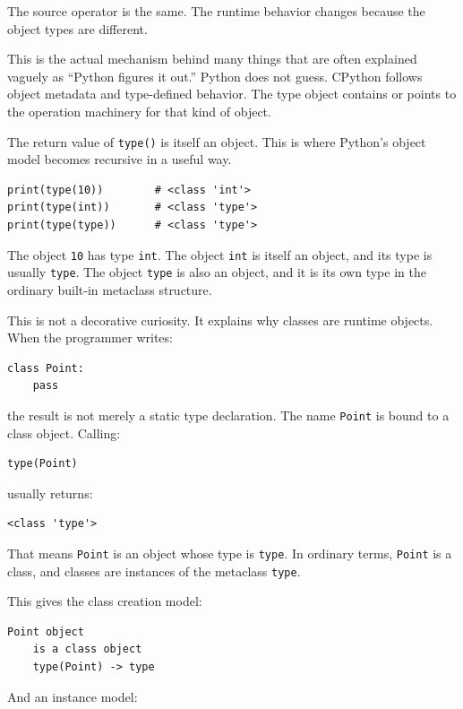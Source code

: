 The source operator is the same. The runtime behavior changes because the object types are different.

This is the actual mechanism behind many things that are often explained vaguely as ``Python figures it out.'' Python does not guess. CPython follows object metadata and type-defined behavior. The type object contains or points to the operation machinery for that kind of object.

The return value of \texttt{type()} is itself an object. This is where Python's object model becomes recursive in a useful way.

\begin{verbatim}
print(type(10))        # <class 'int'>
print(type(int))       # <class 'type'>
print(type(type))      # <class 'type'>
\end{verbatim}

The object \texttt{10} has type \texttt{int}. The object \texttt{int} is itself an object, and its type is usually \texttt{type}. The object \texttt{type} is also an object, and it is its own type in the ordinary built-in metaclass structure.

This is not a decorative curiosity. It explains why classes are runtime objects. When the programmer writes:

\begin{verbatim}
class Point:
    pass
\end{verbatim}

the result is not merely a static type declaration. The name \texttt{Point} is bound to a class object. Calling:

\begin{verbatim}
type(Point)
\end{verbatim}

usually returns:

\begin{verbatim}
<class 'type'>
\end{verbatim}

That means \texttt{Point} is an object whose type is \texttt{type}. In ordinary terms, \texttt{Point} is a class, and classes are instances of the metaclass \texttt{type}.

This gives the class creation model:

\begin{verbatim}
Point object
    is a class object
    type(Point) -> type
\end{verbatim}

And an instance model:

